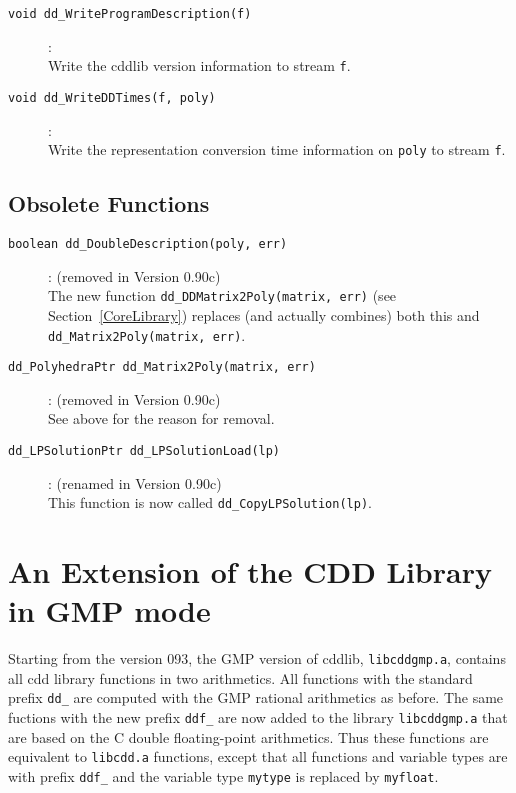 \documentclass[11pt]{article}
\newcommand {\0} {{\bf 0}}
\begin{document}
\begin{description}
\item[{\tt void dd\_WriteProgramDescription(f)}]:\\
Write the cddlib version information to stream {\tt f}.

\item[{\tt void dd\_WriteDDTimes(f, poly)}]:\\
Write the representation conversion time information on {\tt poly}
 to stream {\tt f}.

\end{description}

\subsection{Obsolete Functions}  \label{ObsoleteFunctions}
\begin{description}
\item[{\tt boolean dd\_DoubleDescription(poly, err)}]: 
(removed in Version 0.90c)\\
The new function
{\tt dd\_DDMatrix2Poly(matrix, err)} (see Section~\ref{CoreLibrary}) 
replaces (and actually combines) both this and 
{\tt dd\_Matrix2Poly(matrix, err)}.

\item[{\tt dd\_PolyhedraPtr dd\_Matrix2Poly(matrix, err)}]: 
(removed in Version 0.90c)\\
See above for the reason for removal.

\item[{\tt dd\_LPSolutionPtr dd\_LPSolutionLoad(lp)}]:
(renamed in Version 0.90c)\\
This function is now called {\tt dd\_CopyLPSolution(lp)}.

\end{description}

\section{An Extension of the CDD Library in GMP mode}  \label{GMPLIB}

Starting from the version 093, the GMP version of cddlib, {\tt libcddgmp.a}, contains
all cdd library functions in two arithmetics.   All functions with the standard prefix {\tt dd\_}
are computed with the GMP rational arithmetics as before.  The same fuctions with
the new prefix {\tt ddf\_} are now added to the library  {\tt libcddgmp.a} that are based
on the C  double floating-point arithmetics.  Thus these functions are equivalent to
 {\tt libcdd.a} functions, except that all functions and  variable types are with prefix  {\tt ddf\_} and
the variable type {\tt mytype} is replaced by {\tt myfloat}.
\end{document}

